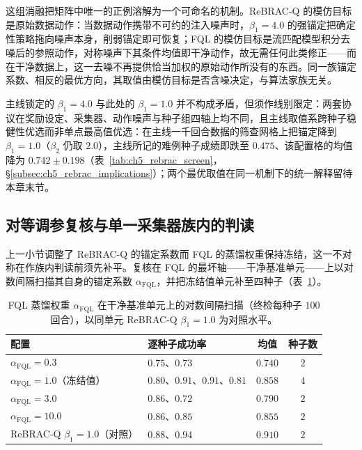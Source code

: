 这组消融把矩阵中唯一的正例溶解为一个可命名的机制。ReBRAC-Q 的模仿目标是原始数据动作：当数据动作携带不可约的注入噪声时，$\beta_1=4.0$ 的强锚定把确定性策略拖向噪声本身，削弱锚定即可恢复；FQL 的模仿目标是流匹配模型积分去噪后的参照动作，对称噪声下其条件均值即干净动作，故无需任何此类修正——而在干净数据上，这一去噪不再提供恰当加权的原始动作所没有的东西。同一族锚定系数、相反的最优方向，其取值由模仿目标是否含噪决定，与算法家族无关。

主线锁定的 $\beta_1=4.0$ 与此处的 $\beta_1=1.0$ 并不构成矛盾，但须作线别限定：两套协议在奖励设定、采集器、动作噪声与种子组四轴上均不同，且主线取值系跨种子稳健性优选而非单点最高值优选：在主线一千回合数据的筛查网格上把锚定降到 $\beta_1=1.0$（$\beta_2$ 仍取 $2.0$），主线所记的难例种子成绩即跌至 $0.475$、该配置格的均值降为 $0.742 \pm 0.198$（表~\ref{tab:ch5_rebrac_screen}，\S\ref{subsec:ch5_rebrac_implications}）；两个最优取值在同一机制下的统一解释留待本章末节。

\subsection{对等调参复核与单一采集器族内的判读}\label{subsec:ch5_algo_rescue}

上一小节调整了 ReBRAC-Q 的锚定系数而 FQL 的蒸馏权重保持冻结，这一不对称在作族内判读前须先补平。复核在 FQL 的最坏轴——干净基准单元——上以对数间隔扫描其自身的锚定系数 $\alpha_{\mathrm{FQL}}$，并把冻结值单元补至四种子（表~\ref{tab:ch5_fql_c1}）。

\begin{table}[t]
\centering
\caption{FQL 蒸馏权重 $\alpha_{\mathrm{FQL}}$ 在干净基准单元上的对数间隔扫描（终检每种子 $100$ 回合），以同单元 ReBRAC-Q $\beta_1{=}1.0$ 为对照水平。}
\label{tab:ch5_fql_c1}
\small
\setlength{\tabcolsep}{6pt}
\begin{tabular}{l l c c}
\toprule
\textbf{配置} & \textbf{逐种子成功率} & \textbf{均值} & \textbf{种子数} \\
\midrule
$\alpha_{\mathrm{FQL}}=0.3$ & $0.75$、$0.73$ & $0.740$ & $2$ \\
$\alpha_{\mathrm{FQL}}=1.0$（冻结值） & $0.80$、$0.91$、$0.91$、$0.81$ & $0.858$ & $4$ \\
$\alpha_{\mathrm{FQL}}=3.0$ & $0.86$、$0.72$ & $0.790$ & $2$ \\
$\alpha_{\mathrm{FQL}}=10.0$ & $0.86$、$0.85$ & $0.855$ & $2$ \\
\midrule
ReBRAC-Q $\beta_1=1.0$（对照） & $0.88$、$0.94$ & $0.910$ & $2$ \\
\bottomrule
\end{tabular}
\end{table}

